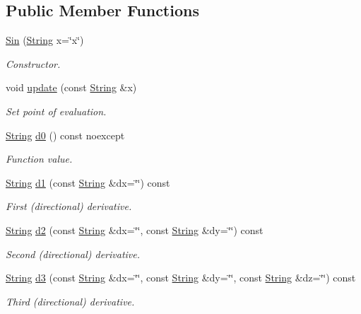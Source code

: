 \subsection*{Public Member Functions}
\begin{DoxyCompactItemize}
\item 
\hyperlink{structFunG_1_1stringify_1_1Sin_a18f123f045b466a62e72dd2b6479dd25}{Sin} (\hyperlink{structFunG_1_1String}{String} x=\char`\"{}x\char`\"{})
\begin{DoxyCompactList}\small\item\em Constructor. \end{DoxyCompactList}\item 
void \hyperlink{structFunG_1_1stringify_1_1Sin_a79e51d4a2ed5edd700582ccf13a18fbd}{update} (const \hyperlink{structFunG_1_1String}{String} \&x)
\begin{DoxyCompactList}\small\item\em Set point of evaluation. \end{DoxyCompactList}\item 
\hyperlink{structFunG_1_1String}{String} \hyperlink{structFunG_1_1stringify_1_1Sin_a9b563e01922acc912035e409c839d02c}{d0} () const noexcept
\begin{DoxyCompactList}\small\item\em Function value. \end{DoxyCompactList}\item 
\hyperlink{structFunG_1_1String}{String} \hyperlink{structFunG_1_1stringify_1_1Sin_a3b0f452d7c19c535aaaccd77343c41f9}{d1} (const \hyperlink{structFunG_1_1String}{String} \&dx=\char`\"{}\char`\"{}) const 
\begin{DoxyCompactList}\small\item\em First (directional) derivative. \end{DoxyCompactList}\item 
\hyperlink{structFunG_1_1String}{String} \hyperlink{structFunG_1_1stringify_1_1Sin_a154ea8e43baa2e5711437dbb788f000f}{d2} (const \hyperlink{structFunG_1_1String}{String} \&dx=\char`\"{}\char`\"{}, const \hyperlink{structFunG_1_1String}{String} \&dy=\char`\"{}\char`\"{}) const 
\begin{DoxyCompactList}\small\item\em Second (directional) derivative. \end{DoxyCompactList}\item 
\hyperlink{structFunG_1_1String}{String} \hyperlink{structFunG_1_1stringify_1_1Sin_a66e04eb833fcba2cdbcff7568d57f3c3}{d3} (const \hyperlink{structFunG_1_1String}{String} \&dx=\char`\"{}\char`\"{}, const \hyperlink{structFunG_1_1String}{String} \&dy=\char`\"{}\char`\"{}, const \hyperlink{structFunG_1_1String}{String} \&dz=\char`\"{}\char`\"{}) const 
\begin{DoxyCompactList}\small\item\em Third (directional) derivative. \end{DoxyCompactList}\end{DoxyCompactItemize}


